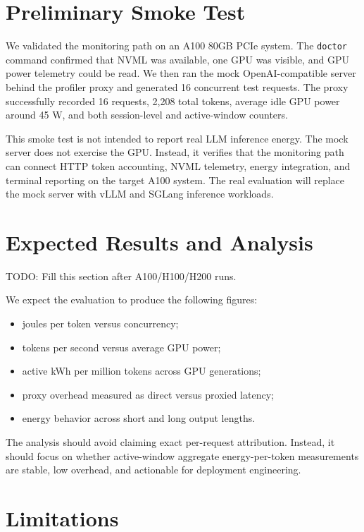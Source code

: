 \documentclass[conference]{IEEEtran}
\begin{document}
\section{Preliminary Smoke Test}

We validated the monitoring path on an A100 80GB PCIe system. The \texttt{doctor} command confirmed that NVML was available, one GPU was visible, and GPU power telemetry could be read. We then ran the mock OpenAI-compatible server behind the profiler proxy and generated 16 concurrent test requests. The proxy successfully recorded 16 requests, 2,208 total tokens, average idle GPU power around 45 W, and both session-level and active-window counters.

This smoke test is not intended to report real LLM inference energy. The mock server does not exercise the GPU. Instead, it verifies that the monitoring path can connect HTTP token accounting, NVML telemetry, energy integration, and terminal reporting on the target A100 system. The real evaluation will replace the mock server with vLLM and SGLang inference workloads.

\section{Expected Results and Analysis}

TODO: Fill this section after A100/H100/H200 runs.

We expect the evaluation to produce the following figures:

\begin{itemize}
    \item joules per token versus concurrency;
    \item tokens per second versus average GPU power;
    \item active kWh per million tokens across GPU generations;
    \item proxy overhead measured as direct versus proxied latency;
    \item energy behavior across short and long output lengths.
\end{itemize}

The analysis should avoid claiming exact per-request attribution. Instead, it should focus on whether active-window aggregate energy-per-token measurements are stable, low overhead, and actionable for deployment engineering.

\section{Limitations}
\end{document}
